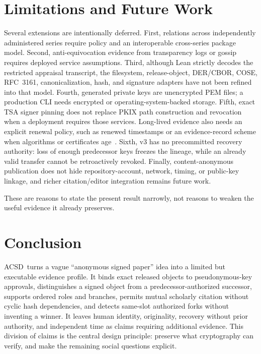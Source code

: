 \documentclass[11pt]{article}
\newcommand{\acsd}{\textsc{ACSD}}
\begin{document}
\section{Limitations and Future Work}

Several extensions are intentionally deferred. First, relations across independently administered series require policy and an interoperable cross-series package model. Second, anti-equivocation evidence from transparency logs or gossip requires deployed service assumptions. Third, although Lean strictly decodes the restricted appraisal transcript, the filesystem, release-object, DER/CBOR, COSE, RFC~3161, canonicalization, hash, and signature adapters have not been refined into that model. Fourth, generated private keys are unencrypted PEM files; a production CLI needs encrypted or operating-system-backed storage. Fifth, exact TSA signer pinning does not replace PKIX path construction and revocation when a deployment requires those services. Long-lived evidence also needs an explicit renewal policy, such as renewed timestamps or an evidence-record scheme when algorithms or certificates age~\cite{ers}. Sixth, v3 has no precommitted recovery authority: loss of enough predecessor keys freezes the lineage, while an already valid transfer cannot be retroactively revoked. Finally, content-anonymous publication does not hide repository-account, network, timing, or public-key linkage, and richer citation/editor integration remains future work.

These are reasons to state the present result narrowly, not reasons to weaken the useful evidence it already preserves.

\section{Conclusion}

\acsd\ turns a vague ``anonymous signed paper'' idea into a limited but executable evidence profile. It binds exact released objects to pseudonymous-key approvals, distinguishes a signed object from a predecessor-authorized successor, supports ordered roles and branches, permits mutual scholarly citation without cyclic hash dependencies, and detects same-slot authorized forks without inventing a winner. It leaves human identity, originality, recovery without prior authority, and independent time as claims requiring additional evidence. This division of claims is the central design principle: preserve what cryptography can verify, and make the remaining social questions explicit.
\end{document}
